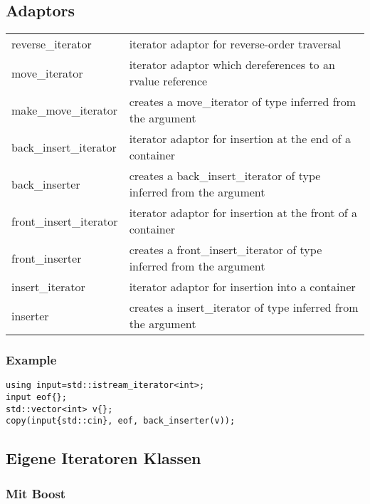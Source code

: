 \subsection{Adaptors}
\begin{tabularx}{\columnwidth}{lX}
	reverse\_iterator      &  iterator adaptor for reverse-order traversal  \\
	move\_iterator         &  iterator adaptor which dereferences to an rvalue reference  \\
	make\_move\_iterator   &  creates a move\_iterator of type inferred from the argument  \\
	back\_insert\_iterator &  iterator adaptor for insertion at the end of a container  \\
	back\_inserter         &  creates a back\_insert\_iterator of type inferred from the argument  \\
	front\_insert\_iterator&  iterator adaptor for insertion at the front of a container  \\
	front\_inserter        &  creates a front\_insert\_iterator of type inferred from the argument  \\
	insert\_iterator       &  iterator adaptor for insertion into a container  \\
	inserter               &  creates a insert\_iterator of type inferred from the argument  
\end{tabularx}

\subsubsection{Example}
\begin{lstlisting}
using input=std::istream_iterator<int>;
input eof{};
std::vector<int> v{};
copy(input{std::cin}, eof, back_inserter(v));
\end{lstlisting}

\subsection{Eigene Iteratoren Klassen}
\subsubsection{Mit Boost}
